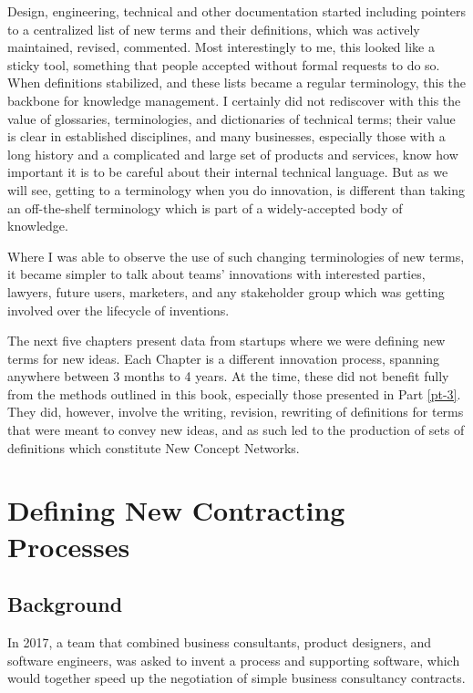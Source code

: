 \documentclass[graybox,envcountchap,sectrefs]{svmono}
\newcommand{\ncnf}{New Concept Network}
\begin{document}
Design, engineering, technical and other documentation started including pointers to a centralized list of new terms and their definitions, which was actively maintained, revised, commented. Most interestingly to me, this looked like a sticky tool, something that people accepted without formal requests to do so. When definitions stabilized, and these lists became a regular terminology, this the backbone for knowledge management. I certainly did not rediscover with this the value of glossaries, terminologies, and dictionaries of technical terms; their value is clear in established disciplines, and many businesses, especially those with a long history and a complicated and large set of products and services, know how important it is to be careful about their internal technical language. But as we will see, getting to a terminology when you do innovation, is different than taking an off-the-shelf terminology which is part of a widely-accepted body of knowledge.

Where I was able to observe the use of such changing terminologies of new terms, it became simpler to talk about teams' innovations with interested parties, lawyers, future users, marketers, and any stakeholder group which was getting involved over the lifecycle of  inventions.

The next five chapters present data from startups where we were defining new terms for new ideas. Each Chapter is a different innovation process, spanning anywhere between 3 months to 4 years. At the time, these did not benefit fully from the methods outlined in this book, especially those presented in Part \ref{pt-3}. They did, however, involve the writing, revision, rewriting of definitions for terms that were meant to convey new ideas, and as such led to the production of sets of definitions which constitute \ncnf s.


\chapter{Defining New Contracting Processes}\label{c:case:consulting-contracts}

\section{Background}
In 2017, a team that combined business consultants, product designers, and software engineers, was asked to invent a process and supporting software, which would together speed up the negotiation of simple business consultancy contracts. 
\end{document}
